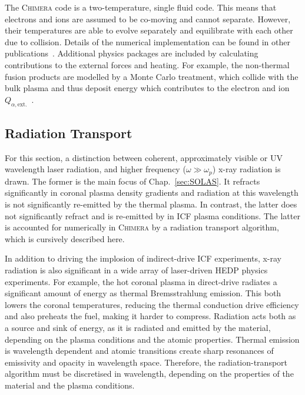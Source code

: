 The \textsc{Chimera} code is a two-temperature, single fluid code.
This means that electrons and ions are assumed to be co-moving and cannot separate.
However, their temperatures are able to evolve separately and equilibrate with each other due to collision.
Details of the numerical implementation can be found in other publications~\cite{chittenden_signatures_2016,crilly_simulation_2020,farrow_extended_2023,oneill_modelling_2023,chaturvedi_simulating_2024}. 
Additional physics packages are included by calculating contributions to the external forces and heating.
For example, the non-thermal fusion products are modelled by a Monte Carlo treatment, which collide with the bulk plasma and thus deposit energy which contributes to the electron and ion $Q_{\alpha,\text{ext.}}$~\cite{tong_burn_2019}.

\subsection{Radiation Transport}%
\label{sec:theory_radtransp}

For this section, a distinction between coherent, approximately visible or \ac{UV} wavelength laser radiation, and higher frequency ($\omega \gg \omega_p$) x-ray radiation is drawn.
The former is the main focus of Chap.~\ref{sec:SOLAS}.
It refracts significantly in coronal plasma density gradients and radiation at this wavelength is not significantly re-emitted by the thermal plasma.
In contrast, the latter does not significantly refract and is re-emitted by in \ac{ICF} plasma conditions.
The latter is accounted for numerically in \textsc{Chimera} by a radiation transport algorithm, which is cursively described here.

In addition to driving the implosion of indirect-drive \ac{ICF} experiments, x-ray radiation is also significant in a wide array of laser-driven \ac{HEDP} physics experiments.
For example, the hot coronal plasma in direct-drive radiates a significant amount of energy as thermal Bremsstrahlung emission.
This both lowers the coronal temperatures, reducing the thermal conduction drive efficiency and also preheats the fuel, making it harder to compress.
Radiation acts both as a source and sink of energy, as it is radiated and emitted by the material, depending on the plasma conditions and the atomic properties.
Thermal emission is wavelength dependent and atomic transitions create sharp resonances of emissivity and opacity in wavelength space.
Therefore, the radiation-transport algorithm must be discretised in wavelength, depending on the properties of the material and the plasma conditions.

